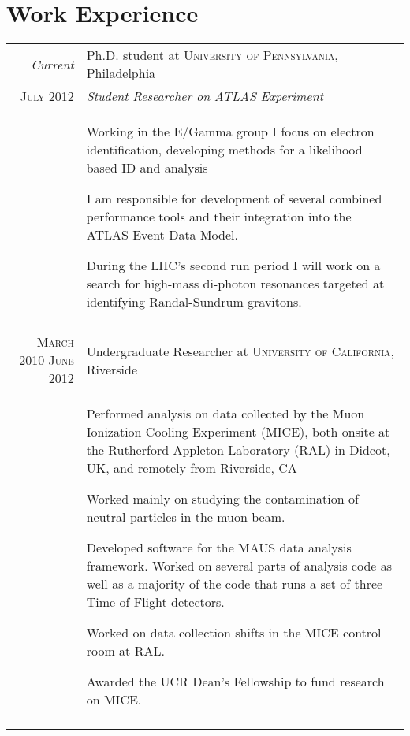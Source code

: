 \documentclass[a4paper,10pt]{article} %
\begin{document}

\section{Work Experience}

\begin{tabular}{r|p{11cm}}
\emph{Current}    & Ph.D. student at \textsc{University of Pennsylvania}, Philadelphia \\
\textsc{July 2012} & \emph{Student Researcher on ATLAS Experiment}\\
				   & \begin{itemize}
					 \footnotesize{
						\item Working in the E/Gamma group I focus on electron identification, developing methods for a likelihood based ID and analysis
						\item I am responsible for development of several combined performance tools and their integration into the ATLAS Event Data Model.
						\item During the LHC's second run period I will work on a search for high-mass di-photon resonances targeted at identifying Randal-Sundrum gravitons.
					 }
					 \end{itemize} \\
\multicolumn{2}{c}{} \\


\textsc{March 2010-June 2012} & Undergraduate Researcher at \textsc{University of California}, Riverside \emph{}\\
				  & \begin{itemize}
					\footnotesize{
						\item Performed analysis on data collected by the Muon Ionization Cooling Experiment (MICE), both onsite at the Rutherford Appleton Laboratory (RAL) in Didcot, UK, and remotely from Riverside, CA
						\item Worked mainly on studying the contamination of neutral particles in the muon beam.
					    \item Developed software for the MAUS data analysis framework.  Worked on several parts of analysis code as well as a majority of the code that runs a set of three Time-of-Flight detectors.
						\item Worked on data collection shifts in the MICE control room at RAL.
						\item Awarded the UCR Dean’s Fellowship to fund research on MICE.
					}
			        \end{itemize} \\
\multicolumn{2}{c}{} \\


\end{tabular}
\end{document}
